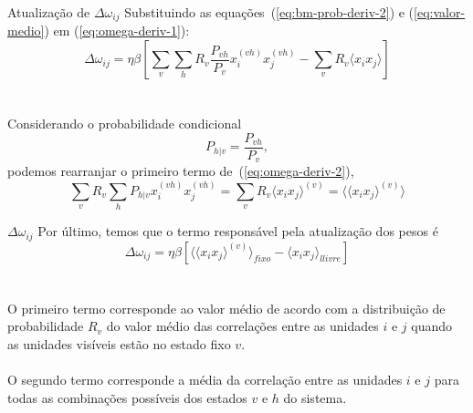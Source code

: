 \begin{frame}{Atualização de $\Delta \omega_{ij}$}%
  \justifying%
  Substituindo as equações~(\ref{eq:bm-prob-deriv-2}) e (\ref{eq:valor-medio}) em (\ref{eq:omega-deriv-1}):
  \begin{equation}%
    \label{eq:omega-deriv-2}%
    \Delta \omega_{ij} = \eta \beta \left[ \sum_{v} \sum_{h} R_{v} \frac{P_{vh}}{P_{v}} x^{(vh)}_{i} x^{(vh)}_{j} - \sum_{v} R_{v} \langle x_{i} x_{j} \rangle \right]
  \end{equation}
  \\~\\
  Considerando o probabilidade condicional 
  \begin{equation}%
    \label{eq:prob-condic}%
    P_{h|v} = \frac{P_{vh}}{P_{v}},
  \end{equation}
  podemos rearranjar o primeiro termo de~(\ref{eq:omega-deriv-2}),
  \begin{equation}%
    \label{eq:omega-deriv-term1}%
    \sum_{v} R_{v} \sum_{h} P_{h|v} x^{(vh)}_{i} x^{(vh)}_{j} = \sum_{v} R_{v} \langle x_{i} x_{j} \rangle^{(v)} = \langle \langle x_{i} x_{j} \rangle^{(v)} \rangle
  \end{equation}
\end{frame}

\begin{frame}{$\Delta \omega_{ij}$}%
  \justifying%
  Por último, temos que o termo responsável pela atualização dos pesos é
  \begin{equation}%
    \label{eq:omega-deriv-final}
    \Delta \omega_{ij} = \eta \beta \left[ \langle \langle x_{i} x_{j} \rangle^{(v)} \rangle_{fixo} - \langle x_{i} x_{j} \rangle_{llivre}  \right]
  \end{equation}
  \\~\\
  O primeiro termo corresponde ao valor médio de acordo com a distribuição de probabilidade $R_{v}$ do valor médio das correlações entre as unidades $i$ e $j$ quando as unidades visíveis estão no estado fixo $v$.
  \\~\\
  O segundo termo corresponde a média da correlação entre as unidades $i$ e $j$ para todas as combinações possíveis dos estados $v$ e $h$ do sistema.
\end{frame}

